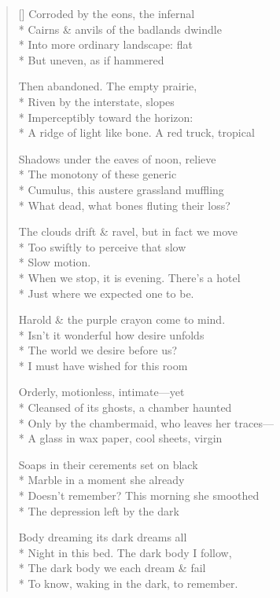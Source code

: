 \label{ch:segue_elision}
\begin{verse}[\versewidth]
Corroded by the eons, the infernal\\*
Cairns \& anvils of the badlands dwindle\\*
Into more ordinary landscape: flat\\*
But uneven, as if hammered

Then abandoned.  The empty prairie,\\*
Riven by the interstate, slopes\\*
Imperceptibly toward the horizon:\\*
A ridge of light like bone. A red truck, tropical

Shadows under the eaves of noon, relieve\\*
The monotony of these generic\\*
Cumulus, this austere grassland muffling\\*
What dead, what bones fluting their loss?

The clouds drift \& ravel, but in fact we move\\*
Too swiftly to perceive that slow\\*
Slow motion.\\*
  When we stop, it is evening. There's a hotel\\*
Just where we expected one to be.

Harold \& the purple crayon come to mind.\\*
Isn't it wonderful how desire unfolds\\*
The world we desire before us?\\*
I must have wished for this room

Orderly, motionless, intimate---yet\\*
Cleansed of its ghosts, a chamber haunted\\*
Only by the chambermaid, who leaves her traces---\\*
A glass in wax paper, cool sheets, virgin

Soaps in their cerements set on black\\*
Marble in a moment she already\\*
Doesn't remember?  This morning she smoothed\\*
The depression left by the dark

Body dreaming its dark dreams all\\*
Night in this bed. The dark body I follow,\\*
The dark body we each dream \& fail\\*
To know, waking in the dark, to remember.
\end{verse}
